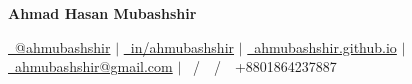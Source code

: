 \begin{center}
{\Huge \textbf{Ahmad Hasan Mubashshir}}
\par\medskip
\href{https://github.com/ahmubashshir}{\faGithub\ @ahmubashshir}  $|$
\href{https://www.linkedin.com/in/ahmubashshir/}{\faLinkedin\ in/ahmubashshir}  $|$
\href{https://ahmubashshir.github.io/}{\faGlobe\ ahmubashshir.github.io} $|$
\href{mailto:ahmubashshir@gmail.com}{\faEnvelope\ ahmubashshir@gmail.com}  $|$
{\faMobile\ /\ \faWhatsapp\ /\ \faTelegram\ +8801864237887}
\end{center}
